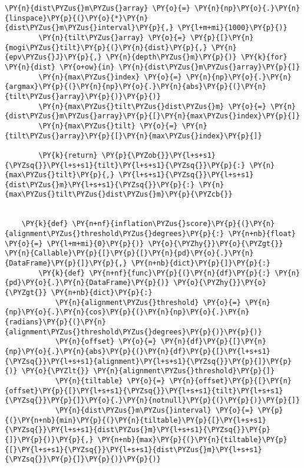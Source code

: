 \begin{tcolorbox}[breakable, size=fbox, boxrule=1pt, pad at break*=1mm,colback=cellbackground, colframe=cellborder]
\begin{Verbatim}[commandchars=\\\{\}]
        \PY{n}{dist\PYZus{}m\PYZus{}array} \PY{o}{=} \PY{n}{np}\PY{o}{.}\PY{n}{linspace}\PY{p}{(}\PY{o}{*}\PY{n}{dist\PYZus{}m\PYZus{}interval}\PY{p}{,} \PY{l+m+mi}{1000}\PY{p}{)}
        \PY{n}{tilt\PYZus{}array} \PY{o}{=} \PY{p}{[}\PY{n}{mogi\PYZus{}tilt}\PY{p}{(}\PY{n}{dist}\PY{p}{,} \PY{n}{epv\PYZus{}J}\PY{p}{,} \PY{n}{depth\PYZus{}m}\PY{p}{)} \PY{k}{for} \PY{n}{dist} \PY{o+ow}{in} \PY{n}{dist\PYZus{}m\PYZus{}array}\PY{p}{]}
        \PY{n}{max\PYZus{}index} \PY{o}{=} \PY{n}{np}\PY{o}{.}\PY{n}{argmax}\PY{p}{(}\PY{n}{np}\PY{o}{.}\PY{n}{abs}\PY{p}{(}\PY{n}{tilt\PYZus{}array}\PY{p}{)}\PY{p}{)}
        \PY{n}{max\PYZus{}tilt\PYZus{}dist\PYZus{}m} \PY{o}{=} \PY{n}{dist\PYZus{}m\PYZus{}array}\PY{p}{[}\PY{n}{max\PYZus{}index}\PY{p}{]}
        \PY{n}{max\PYZus{}tilt} \PY{o}{=} \PY{n}{tilt\PYZus{}array}\PY{p}{[}\PY{n}{max\PYZus{}index}\PY{p}{]}
    
        \PY{k}{return} \PY{p}{\PYZob{}}\PY{l+s+s1}{\PYZsq{}}\PY{l+s+s1}{tilt}\PY{l+s+s1}{\PYZsq{}}\PY{p}{:} \PY{n}{max\PYZus{}tilt}\PY{p}{,} \PY{l+s+s1}{\PYZsq{}}\PY{l+s+s1}{dist\PYZus{}m}\PY{l+s+s1}{\PYZsq{}}\PY{p}{:} \PY{n}{max\PYZus{}tilt\PYZus{}dist\PYZus{}m}\PY{p}{\PYZcb{}}
    
    
    \PY{k}{def} \PY{n+nf}{inflation\PYZus{}score}\PY{p}{(}\PY{n}{alignment\PYZus{}threshold\PYZus{}degrees}\PY{p}{:} \PY{n+nb}{float} \PY{o}{=} \PY{l+m+mi}{0}\PY{p}{)} \PY{o}{\PYZhy{}}\PY{o}{\PYZgt{}} \PY{n}{Callable}\PY{p}{[}\PY{p}{[}\PY{n}{pd}\PY{o}{.}\PY{n}{DataFrame}\PY{p}{]}\PY{p}{,} \PY{n+nb}{dict}\PY{p}{]}\PY{p}{:}
        \PY{k}{def} \PY{n+nf}{func}\PY{p}{(}\PY{n}{df}\PY{p}{:} \PY{n}{pd}\PY{o}{.}\PY{n}{DataFrame}\PY{p}{)} \PY{o}{\PYZhy{}}\PY{o}{\PYZgt{}} \PY{n+nb}{dict}\PY{p}{:}
            \PY{n}{alignment\PYZus{}threshold} \PY{o}{=} \PY{n}{np}\PY{o}{.}\PY{n}{cos}\PY{p}{(}\PY{n}{np}\PY{o}{.}\PY{n}{radians}\PY{p}{(}\PY{n}{alignment\PYZus{}threshold\PYZus{}degrees}\PY{p}{)}\PY{p}{)}
            \PY{n}{offset} \PY{o}{=} \PY{n}{df}\PY{p}{[}\PY{n}{np}\PY{o}{.}\PY{n}{abs}\PY{p}{(}\PY{n}{df}\PY{p}{[}\PY{l+s+s1}{\PYZsq{}}\PY{l+s+s1}{alignment}\PY{l+s+s1}{\PYZsq{}}\PY{p}{]}\PY{p}{)} \PY{o}{\PYZlt{}} \PY{n}{alignment\PYZus{}threshold}\PY{p}{]}
            \PY{n}{tiltable} \PY{o}{=} \PY{n}{offset}\PY{p}{[}\PY{n}{offset}\PY{p}{[}\PY{l+s+s1}{\PYZsq{}}\PY{l+s+s1}{tilt}\PY{l+s+s1}{\PYZsq{}}\PY{p}{]}\PY{o}{.}\PY{n}{notnull}\PY{p}{(}\PY{p}{)}\PY{p}{]}
            \PY{n}{dist\PYZus{}m\PYZus{}interval} \PY{o}{=} \PY{p}{(}\PY{n+nb}{min}\PY{p}{(}\PY{n}{tiltable}\PY{p}{[}\PY{l+s+s1}{\PYZsq{}}\PY{l+s+s1}{dist\PYZus{}m}\PY{l+s+s1}{\PYZsq{}}\PY{p}{]}\PY{p}{)}\PY{p}{,} \PY{n+nb}{max}\PY{p}{(}\PY{n}{tiltable}\PY{p}{[}\PY{l+s+s1}{\PYZsq{}}\PY{l+s+s1}{dist\PYZus{}m}\PY{l+s+s1}{\PYZsq{}}\PY{p}{]}\PY{p}{)}\PY{p}{)}
    

\end{Verbatim}
\end{tcolorbox}
